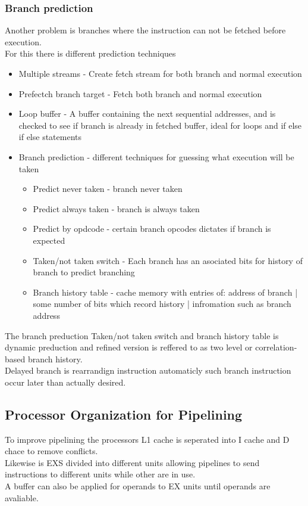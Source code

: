 \documentclass[12pt, a4paper]{article}
\begin{document}
			\subsubsection{Branch prediction}
				Another problem is branches where the instruction can not be fetched before execution.\\
				For this there is different prediction techniques\\
				\begin{itemize}
					\item Multiple streams - Create fetch stream for both branch and normal execution
					\item Prefectch branch target - Fetch both branch and normal execution
					\item Loop buffer - A buffer containing the next sequential addresses, and is checked to see if branch is already in fetched buffer, ideal for loops and if else if else statements
					\item Branch prediction - different techniques for guessing what execution will be taken
					\begin{itemize}
						\item Predict never taken - branch never taken
						\item Predict always taken - branch is always taken
						\item Predict by opdcode - certain branch opcodes dictates if branch is expected
						\item Taken/not taken switch - Each branch has an asociated bits for history of branch to predict branching
						\item Branch history table - cache memory with entries of: address of branch | some number of bits which record history | infromation such as branch address
					\end{itemize}
				\end{itemize}
				The branch preduction Taken/not taken switch and branch history table is dynamic preduction and refined version is reffered to as two level or correlation-based branch history.\\
				Delayed branch is rearrandign instruction automaticly such branch instruction occur later than actually desired.\\
		\subsection{Processor Organization for Pipelining}
			To improve pipelining the processors L1 cache is seperated into I cache and D chace to remove conflicts.\\
			Likewise is EXS divided into different units allowing pipelines to send instructions to different units while other are in use.\\
			A buffer can also be applied for operands to EX units until operands are avaliable.\\
\end{document}
